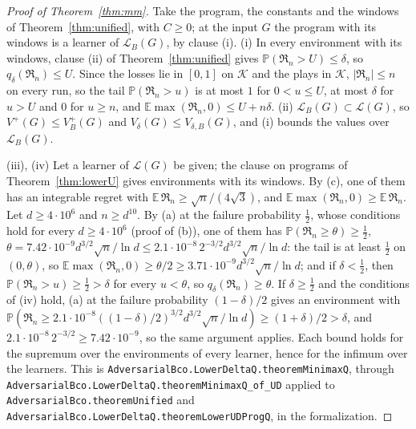 \documentclass[11pt]{amsart}
\theoremstyle{definition}
\numberwithin{equation}{section}
\newcommand{\E}{\mathbb{E}}
\newcommand{\Prob}{\mathbb{P}}
\newcommand{\cK}{\mathcal{K}}
\newcommand{\Reg}{\mathfrak{R}}
\begin{document}
\begin{proof}[Proof of Theorem~\ref{thm:mm}]
Take the program, the constants and the windows of Theorem~\ref{thm:unified}, with $C\ge0$; at the input $G$ the program with its windows is a learner of $\mathcal L_B(G)$, by clause (i). (i) In every environment with its windows, clause (ii) of Theorem~\ref{thm:unified} gives $\Prob(\Reg_n>U)\le\delta$, so $q_\delta(\Reg_n)\le U$. Since the losses lie in $[0,1]$ on $\cK$ and the plays in $\cK$, $|\Reg_n|\le n$ on every run, so the tail $\Prob(\Reg_n>u)$ is at most $1$ for $0<u\le U$, at most $\delta$ for $u>U$ and $0$ for $u\ge n$, and $\E\max(\Reg_n,0)\le U+n\delta$. (ii) $\mathcal L_B(G)\subset\mathcal L(G)$, so $V^+(G)\le V^+_B(G)$ and $V_\delta(G)\le V_{\delta,B}(G)$, and (i) bounds the values over $\mathcal L_B(G)$.

(iii), (iv) Let a learner of $\mathcal L(G)$ be given; the clause on programs of Theorem~\ref{thm:lowerU} gives environments with its windows. By (c), one of them has an integrable regret with $\E\,\Reg_n\ge\sqrt n/(4\sqrt3)$, and $\E\max(\Reg_n,0)\ge\E\,\Reg_n$. Let $d\ge4\cdot10^6$ and $n\ge d^{10}$. By (a) at the failure probability $\frac12$, whose conditions hold for every $d\ge4\cdot10^6$ (proof of (b)), one of them has $\Prob(\Reg_n\ge\theta)\ge\frac12$, $\theta=7.42\cdot10^{-9}d^{3/2}\sqrt n/\ln d\le2.1\cdot10^{-8}\,2^{-3/2}d^{3/2}\sqrt n/\ln d$: the tail is at least $\frac12$ on $(0,\theta)$, so $\E\max(\Reg_n,0)\ge\theta/2\ge3.71\cdot10^{-9}d^{3/2}\sqrt n/\ln d$; and if $\delta<\frac12$, then $\Prob(\Reg_n>u)\ge\frac12>\delta$ for every $u<\theta$, so $q_\delta(\Reg_n)\ge\theta$. If $\delta\ge\frac12$ and the conditions of (iv) hold, (a) at the failure probability $(1-\delta)/2$ gives an environment with $\Prob(\Reg_n\ge2.1\cdot10^{-8}((1-\delta)/2)^{3/2}d^{3/2}\sqrt n/\ln d)\ge(1+\delta)/2>\delta$, and $2.1\cdot10^{-8}\,2^{-3/2}\ge7.42\cdot10^{-9}$, so the same argument applies. Each bound holds for the supremum over the environments of every learner, hence for the infimum over the learners.
This is \texttt{AdversarialBco.LowerDeltaQ.theoremMinimaxQ}, through \texttt{AdversarialBco.\allowbreak LowerDeltaQ.\allowbreak theoremMinimaxQ\_of\_UD} applied to \texttt{AdversarialBco.theoremUnified} and \texttt{AdversarialBco.LowerDeltaQ.theoremLowerUDProgQ}, in the formalization.
\end{proof}
\end{document}
